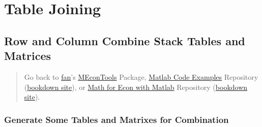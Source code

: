 \documentclass[
]{book}
\begin{document}
\hypertarget{table-joining}{%
\section{Table Joining}\label{table-joining}}

\hypertarget{row-and-column-combine-stack-tables-and-matrices}{%
\subsection{Row and Column Combine Stack Tables and Matrices}\label{row-and-column-combine-stack-tables-and-matrices}}

\begin{quote}
Go back to \href{http://fanwangecon.github.io/}{fan}'s \href{https://fanwangecon.github.io/MEconTools/}{MEconTools} Package, \href{https://fanwangecon.github.io/M4Econ/}{Matlab Code Examples} Repository (\href{https://fanwangecon.github.io/M4Econ/bookdown}{bookdown site}), or \href{https://fanwangecon.github.io/Math4Econ/}{Math for Econ with Matlab} Repository (\href{https://fanwangecon.github.io/Math4Econ/bookdown}{bookdown site}).
\end{quote}

\hypertarget{generate-some-tables-and-matrixes-for-combination}{%
\subsubsection{Generate Some Tables and Matrixes for Combination}\label{generate-some-tables-and-matrixes-for-combination}}
\end{document}
